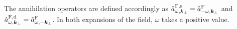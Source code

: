 \documentclass[aps,prd,preprintnumbers,nofootinbib,showpacs,11pt]{revtex4}%
\begin{document}
\begin{widetext}
The annihilation operators are defined accordingly as 
${\hat a}_{\omega,{\bm k}_\perp}^{{\rm F},{\rm s}}={\hat a}_{-\omega,{\bm k}_\perp}^{{\rm F}}$
and 
${\hat a}_{\omega,{\bm k}_\perp}^{{\rm F},{\rm d}}={\hat a}_{\omega,-{\bm k}_\perp}^{{\rm F}}$.
In both expansions of the field, $\omega$ takes a positive value. 


\end{widetext}
\end{document}
